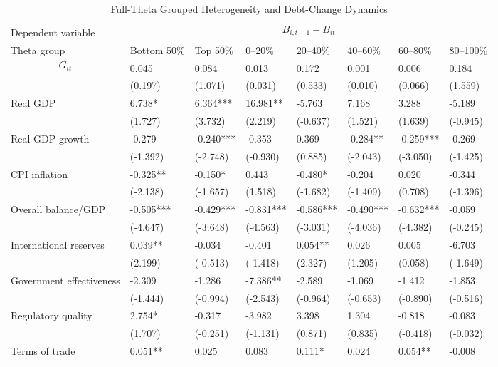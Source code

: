 \begin{table}[H]\centering
\begin{threeparttable}
\caption{Full-Theta Grouped Heterogeneity and Debt-Change Dynamics}
\label{tab:theta_group_heterogeneity_debt}
\scriptsize
\begin{tabularx}{\textwidth}{lYYYYYYY}
\toprule
Dependent variable &  \\
\cmidrule(lr){2-8}
Theta group & Bottom 50\% & Top 50\% & 0--20\% & 20--40\% & 40--60\% & 60--80\% & 80--100\% \\
\midrule
$$G_{it}$$ & 0.045 & 0.084 & 0.013 & 0.172 & 0.001 & 0.006 & 0.184 \\
  & (0.197) & (1.071) & (0.031) & (0.533) & (0.010) & (0.066) & (1.559) \\
Real GDP & 6.738* & 6.364*** & 16.981** & -5.763 & 7.168 & 3.288 & -5.189 \\
  & (1.727) & (3.732) & (2.219) & (-0.637) & (1.521) & (1.639) & (-0.945) \\
Real GDP growth & -0.279 & -0.240*** & -0.353 & 0.369 & -0.284** & -0.259*** & -0.269 \\
  & (-1.392) & (-2.748) & (-0.930) & (0.885) & (-2.043) & (-3.050) & (-1.425) \\
CPI inflation & -0.325** & -0.150* & 0.443 & -0.480* & -0.204 & 0.020 & -0.344 \\
  & (-2.138) & (-1.657) & (1.518) & (-1.682) & (-1.409) & (0.708) & (-1.396) \\
Overall balance/GDP & -0.505*** & -0.429*** & -0.831*** & -0.586*** & -0.490*** & -0.632*** & -0.059 \\
  & (-4.647) & (-3.648) & (-4.563) & (-3.031) & (-4.036) & (-4.382) & (-0.245) \\
International reserves & 0.039** & -0.034 & -0.401 & 0.054** & 0.026 & 0.005 & -6.703 \\
  & (2.199) & (-0.513) & (-1.418) & (2.327) & (1.205) & (0.058) & (-1.649) \\
Government effectiveness & -2.309 & -1.286 & -7.386** & -2.589 & -1.069 & -1.412 & -1.853 \\
  & (-1.444) & (-0.994) & (-2.543) & (-0.964) & (-0.653) & (-0.890) & (-0.516) \\
Regulatory quality & 2.754* & -0.317 & -3.982 & 3.398 & 1.304 & -0.818 & -0.083 \\
  & (1.707) & (-0.251) & (-1.131) & (0.871) & (0.835) & (-0.418) & (-0.032) \\
Terms of trade & 0.051** & 0.025 & 0.083 & 0.111* & 0.024 & 0.054** & -0.008 \\

\end{tabularx}
\end{threeparttable}
\end{table}
